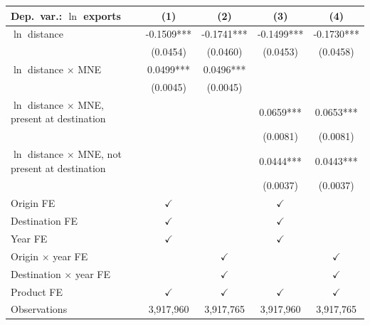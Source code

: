 \begin{tabular}{lcccc} \hline
Dep.\ var.: $\ln$ exports & (1) & (2) & (3) & (4) \\ \hline
$\ln$ distance & -0.1509*** & -0.1741*** & -0.1499*** & -0.1730*** \\
 & (0.0454) & (0.0460) & (0.0453) & (0.0458) \\
$\ln$ distance $\times$ MNE & 0.0499*** & 0.0496*** &  &  \\
 & (0.0045) & (0.0045) &  &  \\
$\ln$ distance $\times$ MNE, present at destination &  &  & 0.0659*** & 0.0653*** \\
 &  &  & (0.0081) & (0.0081) \\
$\ln$ distance $\times$ MNE, not present at destination &  &  & 0.0444*** & 0.0443*** \\
 &  &  & (0.0037) & (0.0037) \\
\hline
Origin FE & $\checkmark$ &  & $\checkmark$ &  \\
Destination FE & $\checkmark$ &  & $\checkmark$ &  \\
Year FE & $\checkmark$ &  & $\checkmark$ &  \\
Origin $\times$ year FE &  & $\checkmark$ &  & $\checkmark$ \\
Destination $\times$ year FE &  & $\checkmark$ &  & $\checkmark$ \\
Product FE & $\checkmark$ & $\checkmark$ & $\checkmark$ & $\checkmark$ \\
\hline
Observations & 3,917,960 & 3,917,765 & 3,917,960 & 3,917,765 \\
\hline
\end{tabular}
